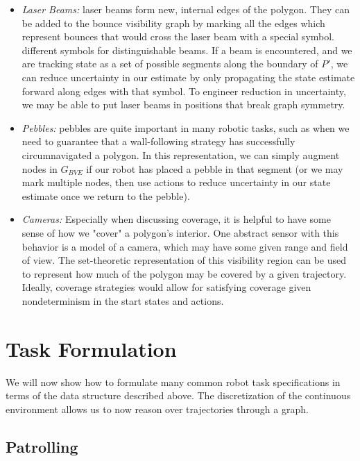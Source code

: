 \documentclass[]{styles/svproc}  %
\begin{document}
\begin{itemize}
\item \emph{Laser Beams:} laser beams form new, internal edges of the polygon. They can be
added to the bounce visibility graph by marking all the edges which represent
bounces that would cross the laser beam with a special symbol. different symbols
for distinguishable beams. If a beam is encountered, and we are tracking state
as a set of possible segments along the boundary of $P'$, we can reduce
uncertainty in our estimate by only propagating the state estimate
forward along edges with that symbol. To engineer reduction in uncertainty,
we may be able to put laser beams in positions that break graph symmetry.
\item \emph{Pebbles:} pebbles are quite important in many robotic tasks, such as
when we need to guarantee that a wall-following strategy has successfully
circumnavigated a polygon. In this representation, we can simply augment nodes
in $G_{BVE}$ if our robot has placed a pebble in that segment (or we may mark
multiple nodes, then use actions to reduce uncertainty in our state estimate
once we return to the pebble).
\item \emph{Cameras:} Especially when discussing coverage, it is helpful to have
some sense of how we "cover" a polygon's interior. One abstract sensor with this
behavior is a model of a camera, which may have some given range and field of
view. The set-theoretic representation of this visibility region can be used to
represent how much of the polygon may be covered by a given trajectory. Ideally,
coverage strategies would allow for satisfying coverage given nondeterminism in
the start states and actions.
\end{itemize}

\section{Task Formulation}

We will now show how to formulate many common robot task specifications in terms
of the data structure described above. The discretization of the continuous
environment allows us to now reason over trajectories through a graph.




\subsection{Patrolling \label{patrol}}
\end{document}
